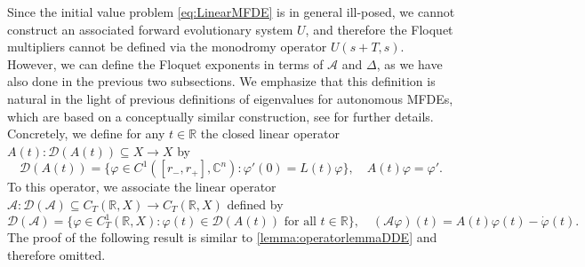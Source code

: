 \documentclass[english]{myarticle}
\begin{document}
\begin{sloppypar}
Since the initial value problem \eqref{eq:LinearMFDE} is in general ill-posed, we cannot construct an associated forward evolutionary system $U$, and therefore the Floquet multipliers cannot be defined via the monodromy operator $U(s+T,s)$. However, we can define the Floquet exponents in terms of $\mathcal{A}$ and $\Delta$, as we have also done in the previous two subsections. We emphasize that this definition is natural in the light of previous definitions of eigenvalues for autonomous MFDEs, which are based on a conceptually similar construction, see \cite{MalletParet1999,MALLETPARET2005,Hupkes2006} for further details. Concretely, we define for any $t\in \mathbb{R}$ the closed linear operator $A(t) : \mathcal{D}(A(t)) \subseteq X \to X$ by
\begin{equation*} 
    \mathcal{D}(A(t)) = \{ \varphi \in C^1([r_{-},r_{+}],\mathbb{C}^n) : \varphi '(0) = L(t) \varphi \}, \quad A(t)\varphi = \varphi'.
\end{equation*}
To this operator, we associate the linear operator $\mathcal{A} : \mathcal{D}(\mathcal{A}) \subseteq C_T(\mathbb{R},X) \to C_T(\mathbb{R},X)$ defined by 
\begin{equation} \label{eq:curlya_mfde}
     \mathcal{D}(\mathcal{A}) = \{ \varphi \in C_T^1(\mathbb{R},X) : \varphi(t) \in \mathcal{D}(A(t)) \mbox{ for all $t \in \mathbb{R}$} \}, \quad (\mathcal{A}\varphi)(t) = A(t)\varphi(t) - \dot{\varphi}(t). 
\end{equation}
The proof of the following result is similar to \cref{lemma:operatorlemmaDDE} and therefore omitted.


\end{sloppypar}
\end{document}
